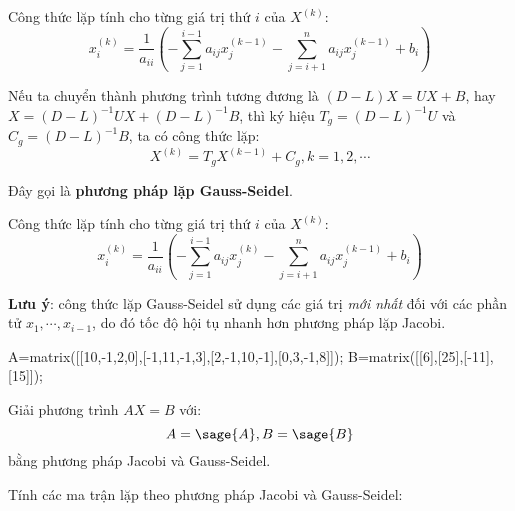 \documentclass[12pt]{article}
\begin{document}
Công thức lặp tính cho từng giá trị thứ $i$ của $X^{(k)}$:
\begin{equation}
x_i^{(k)}=\frac{1}{a_{ii}} \left( -\sum_{j=1}^{i-1} a_{ij} x_j^{(k-1)} -\sum_{j=i+1}^{n} a_{ij} x_j^{(k-1)} + b_i\right)
\end{equation}

\newpage{}

Nếu ta chuyển thành phương trình tương đương là $(D-L)X = UX+B$, hay $X=(D-L)^{-1}UX+(D-L)^{-1}B$, thì ký hiệu $T_g=(D-L)^{-1}U$ và $C_g=(D-L)^{-1}B$, ta có công thức lặp:
\begin{equation}
X^{(k)}=T_g X^{(k-1)}+C_g, k=1, 2, \cdots
\end{equation}

Đây gọi là \textbf{phương pháp lặp Gauss-Seidel}.

Công thức lặp tính cho từng giá trị thứ $i$ của $X^{(k)}$:
\begin{equation}
x_i^{(k)}=\frac{1}{a_{ii}} \left( -\sum_{j=1}^{i-1} a_{ij} x_j^{(k)} -\sum_{j=i+1}^{n} a_{ij} x_j^{(k-1)} + b_i\right)
\end{equation}

\textbf{Lưu ý}: công thức lặp Gauss-Seidel sử dụng các giá trị \emph{mới nhất} đối với các phần tử $x_1, \cdots, x_{i-1}$, do đó tốc độ hội tụ nhanh hơn phương pháp lặp Jacobi.

\newpage{}

\begin{sagesilent}
A=matrix([[10,-1,2,0],[-1,11,-1,3],[2,-1,10,-1],[0,3,-1,8]]);
B=matrix([[6],[25],[-11],[15]]);
\end{sagesilent}

Giải phương trình $AX=B$ với:
\begin{equation}
 A=\sage{A}, B=\sage{B}
\end{equation}
bằng phương pháp Jacobi và Gauss-Seidel.

\newpage{}

Tính các ma trận lặp theo phương pháp Jacobi và Gauss-Seidel:
\end{document}
